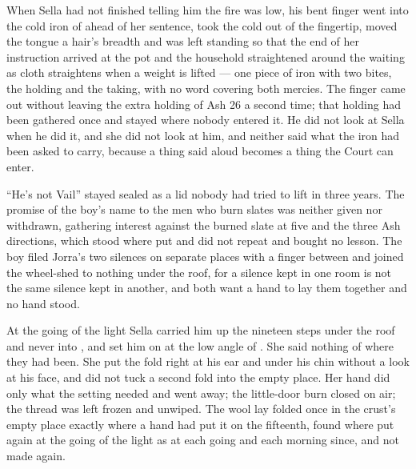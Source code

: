 When Sella had not finished telling him the fire was low, his bent finger went into the cold iron of  ahead of her sentence, took the cold out of the fingertip, moved the tongue a hair's breadth and was left standing so that the end of her instruction arrived at the pot and the household straightened around the waiting as cloth straightens when a weight is lifted — one piece of iron with two bites, the holding and the taking, with no  word covering both mercies. The finger came out without leaving the extra holding of Ash 26 a second time; that holding had been gathered once and stayed where nobody entered it. He did not look at Sella when he did it, and she did not look at him, and neither said what the iron had been asked to carry, because a thing said aloud becomes a thing the Court can enter.

“He's not Vail” stayed sealed as a lid nobody had tried to lift in three years. The promise of the boy's name to the men who burn slates was neither given nor withdrawn, gathering interest against the burned slate at five and the three Ash directions, which stood where put and did not repeat and bought no lesson. The boy filed Jorra's two silences on separate places with a finger between and joined the wheel-shed to nothing under the roof, for a silence kept in one room is not the same silence kept in another, and both want a hand to lay them together and no hand stood.

\scenebreak

At the going of the light Sella carried him up the nineteen steps under the roof and never into , and set him on  at the low angle of . She said nothing of where they had been. She put the fold right at his ear and under his chin without a look at his face, and did not tuck a second fold into the empty place. Her hand did only what the setting needed and went away; the little-door burn closed on air; the thread was left frozen and unwiped. The wool lay folded once in the crust's empty place exactly where a hand had put it on the fifteenth, found where put again at the going of the light as at each going and each morning since, and not made again.

